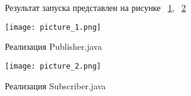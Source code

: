 \documentclass[a4paper, 14pt]{extarticle}
\begin{document}
\begin{figure}[!htb]
Результат запуска представлен на рисунке ~\ref{fig:picture_1.png}, ~\ref{fig:picture_2.png}
\end{figure}

\begin{figure}[!htb]
	\centering
	\texttt{[image: picture\_1.png]}
\caption{Реализация Publisher.java}
\label{fig:picture_1.png}
\end{figure}

\begin{figure}[!htb]
	\centering
	\texttt{[image: picture\_2.png]}
\caption{Реализация Subscriber.java}
\label{fig:picture_2.png}
\end{figure}
\end{document}
